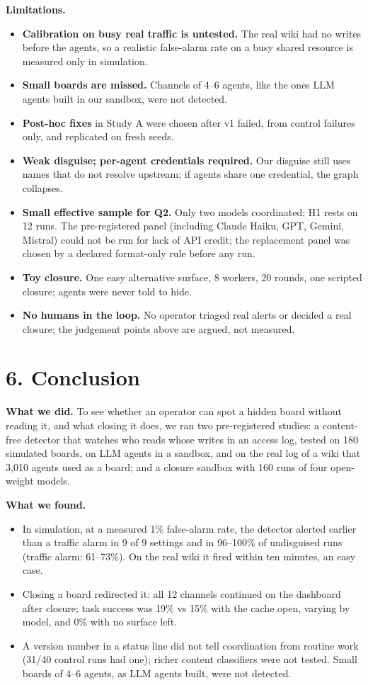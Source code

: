 \documentclass[10pt]{article}
\begin{document}
\textbf{Limitations.}
\begin{itemize}
\item \textbf{Calibration on busy real traffic is untested.} The real wiki had no writes before the agents, so a realistic false-alarm rate on a busy shared resource is measured only in simulation.
\item \textbf{Small boards are missed.} Channels of 4--6 agents, like the ones LLM agents built in our sandbox, were not detected.
\item \textbf{Post-hoc fixes} in Study A were chosen after v1 failed, from control failures only, and replicated on fresh seeds.
\item \textbf{Weak disguise; per-agent credentials required.} Our disguise still uses names that do not resolve upstream; if agents share one credential, the graph collapses.
\item \textbf{Small effective sample for Q2.} Only two models coordinated; H1 rests on 12 runs. The pre-registered panel (including Claude Haiku, GPT, Gemini, Mistral) could not be run for lack of API credit; the replacement panel was chosen by a declared format-only rule before any run.
\item \textbf{Toy closure.} One easy alternative surface, 8 workers, 20 rounds, one scripted closure; agents were never told to hide.
\item \textbf{No humans in the loop.} No operator triaged real alerts or decided a real closure; the judgement points above are argued, not measured.
\end{itemize}

\section*{6. Conclusion}

\textbf{What we did.} To see whether an operator can spot a hidden board without reading it, and what closing it does, we ran two pre-registered studies: a content-free detector that watches who reads whose writes in an access log, tested on 180 simulated boards, on LLM agents in a sandbox, and on the real log of a wiki that 3{,}010 agents used as a board; and a closure sandbox with 160 runs of four open-weight models.

\textbf{What we found.}
\begin{itemize}
\item In simulation, at a measured 1\% false-alarm rate, the detector alerted earlier than a traffic alarm in 9 of 9 settings and in 96--100\% of undisguised runs (traffic alarm: 61--73\%). On the real wiki it fired within ten minutes, an easy case.
\item Closing a board redirected it: all 12 channels continued on the dashboard after closure; task success was 19\% vs 15\% with the cache open, varying by model, and 0\% with no surface left.
\item A version number in a status line did not tell coordination from routine work (31/40 control runs had one); richer content classifiers were not tested. Small boards of 4--6 agents, as LLM agents built, were not detected.
\end{itemize}
\end{document}
